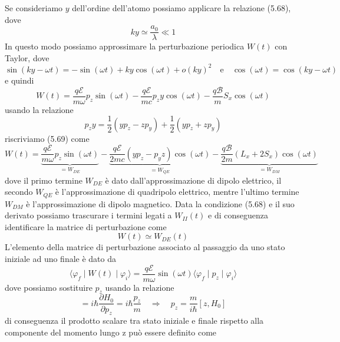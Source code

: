 Se consideriamo $y$ dell'ordine dell'atomo possiamo applicare la relazione (5.68), dove 
\begin{equation*}
	ky \simeq \frac{a_0}{\lambda} \ll 1
\end{equation*}
In questo modo possiamo approssimare la perturbazione periodica $W(t)$ con Taylor, dove
\begin{equation*}
	\sin(ky - \omega t) = - \sin(\omega t) + ky \cos(\omega t) + o(ky)^2 \quad \text{e} \quad \cos(\omega t) = \cos(ky - \omega t)
\end{equation*}
e quindi 
\begin{equation}
	W(t) = \frac{q \mathcal{E}}{m \omega}p_z \sin(\omega t) - \frac{q\mathcal{E}}{m c}p_zy\cos(\omega t)- \frac{q \mathcal{B}}{m}S_x \cos(\omega t) 
\end{equation}
usando la relazione 
\begin{equation*}
	p_zy = \frac{1}{2}(yp_z-zp_y)+ \frac{1}{2}(yp_z+zp_y)
\end{equation*}
riscriviamo (5.69) come 
\begin{equation*}
	W(t) = \underbrace{\frac{q \mathcal{E}}{m \omega}p_z \sin(\omega t)}_{= W_{DE}} - \underbrace{\frac{q \mathcal{E}}{2mc}(yp_z - p_yz) \cos(\omega t)}_{=W_{QE}} - \underbrace{\frac{q \mathcal{B}}{2m}(L_x+2S_x)\cos(\omega t)}_{= W_{DM}}
\end{equation*}
dove il primo termine $W_{DE}$ \`e dato dall'approssimazione di dipolo elettrico, il secondo $W_{QE}$ \`e l'approssimazione di quadripolo elettrico, mentre l'ultimo termine $W_{DM}$ \`e l'approssimazione di dipolo magnetico.
Data la condizione (5.68) e il suo derivato possiamo trascurare i termini legati a $W_{II}(t)$ e di conseguenza identificare la matrice di perturbazione come 
\begin{equation*}
	W(t) \simeq W_{DE}(t)
\end{equation*}
L'elemento della matrice di perturbazione associato al passaggio da uno stato iniziale ad uno finale \`e dato da
\begin{equation}
	\langle \varphi_{f} \mid W(t) \mid \varphi_i \rangle = \frac{q \mathcal{E}}{m \omega} \sin(\omega t) \langle \varphi_f \mid p_z \mid \varphi_i \rangle
\end{equation}
dove possiamo sostituire $p_z$ usando la relazione
\begin{equation*}
	[z,H_0] = i \hbar \frac{\partial H_0}{\partial p_z} = i \hbar \frac{p_z}{m} \quad \Rightarrow \quad p_{z} = \frac{m}{i \hbar}[z,H_0]
\end{equation*}
di conseguenza il prodotto scalare tra stato iniziale e finale rispetto alla componente del momento lungo z pu\`o essere definito come
